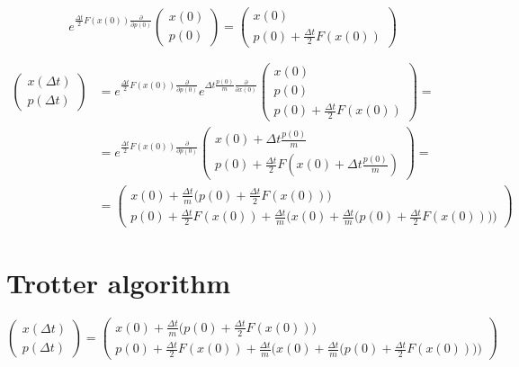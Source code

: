 	$$e^{\frac{\Delta t}{2}F(x(0))\frac{\partial}{\partial p(0)}}\begin{pmatrix}x(0)\\p(0)\end{pmatrix} = \begin{pmatrix}x(0)\\p(0) + \frac{\Delta t}{2}F(x(0))\end{pmatrix}$$

	\begin{align*}
		\begin{pmatrix} x(\Delta t)\\ p(\Delta t)\end{pmatrix} &= e^{\frac{\Delta t}{2}F(x(0))\frac{\partial}{\partial p(0)}}e^{\Delta t\frac{p(0)}{m}\frac{\partial }{\partial x(0)}}\begin{pmatrix} x(0)\\p(0)\\p(0) + \frac{\Delta t}{2}F(x(0))\end{pmatrix} =\\
																													 & = e^{\frac{\Delta t}{2}F(x(0))\frac{\partial}{\partial p(0)}}\begin{pmatrix}x(0) + \Delta t\frac{p(0)}{m}\\p(0) + \frac{\Delta t}{2}F(x(0) + \Delta t\frac{p(0)}{m})\end{pmatrix} =\\
																													 &= \begin{pmatrix} x(0) + \frac{\Delta t}{m}\biggl(p(0) + \frac{\Delta t}{2}F(x(0))\biggr) \\ p(0) + \frac{\Delta t}{2}F(x(0)) + \frac{\Delta t}{m}\biggl(x(0) + \frac{\Delta t}{m}\biggl(p(0) + \frac{\Delta t}{2}F(x(0))\biggr)\biggr)\end{pmatrix}
	\end{align*}

\section{Trotter algorithm}

$$\begin{pmatrix} x(\Delta t)\\ p(\Delta t)\end{pmatrix} =\begin{pmatrix} x(0) + \frac{\Delta t}{m}\biggl(p(0) + \frac{\Delta t}{2}F(x(0))\biggr) \\ p(0) + \frac{\Delta t}{2}F(x(0)) + \frac{\Delta t}{m}\biggl(x(0) + \frac{\Delta t}{m}\biggl(p(0) + \frac{\Delta t}{2}F(x(0))\biggr)\biggr)\end{pmatrix}$$

